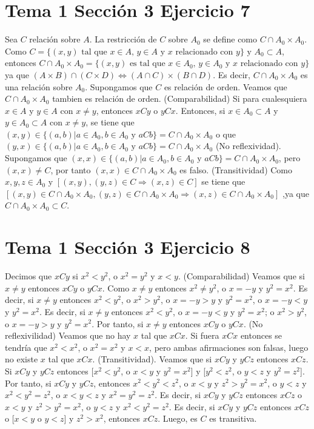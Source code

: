 \documentclass{article}
\begin{document}
\section{Tema 1 Sección 3 Ejercicio 7}
Sea \(C\) relación sobre \(A\). La restricción de \(C\) sobre \(A_0\) se define como \(C\cap A_0\times A_0\). Como \(C=\{(x,y)\text{ tal que } x\in A \text{, } y \in A \text{ y } x \text{ relacionado con }y\} \text{ y } A_0 \subset A\), entonces \(C\cap A_0 \times A_0 =\{(x,y) \text{ es tal que } x\in A_0 \text{, } y \in A_0 \text{ y } x \text{ relacionado con } y\}\) ya que \((A\times B)\cap(C\times D)\Leftrightarrow (A \cap C)\times (B \cap D)\). Es decir, \(C\cap A_0 \times A_0\)  es una relación sobre \(A_0\). Supongamos que \(C\) es relación de orden. Veamos que \(C\cap A_0 \times A_0\) tambien es relación de orden. (Comparabilidad) Si para cualesquiera \(x\in A\) y \(y\in A\) con \(x\neq y\), entonces \(xCy\) o \(yCx\). Entonces, si \(x \in A_0 \subset A\) y \(y \in A_0 \subset A\) con \(x\neq y\), se tiene que \((x,y)\in \{(a,b)| a\in A_0, b\in A_0 \text{ y } aCb\} = C\cap A_0 \times A_0 \) o que \((y,x)\in \{(a,b)| a\in A_0, b\in A_0 \text { y } aCb\} = C\cap A_0 \times A_0 \) (No reflexividad). Supongamos que \((x,x)\in \{(a,b)| a\in A_0, b\in A_0 \text { y } aCb\} = C\cap A_0 \times A_0 \), pero \((x,x)\neq C\), por tanto  \((x,x)\in C\cap A_0 \times A_0 \) es falso. (Transitividad) Como \(x, y, z \in A_0\text{ y } [(x,y),(y,z)\in C \Rightarrow (x,z)\in C]\) se tiene que \([(x,y)\in C\cap A_0 \times A_0,(y,z)\in C\cap A_0 \times A_0 \Rightarrow (x,z)\in C\cap A_0 \times A_0]\) ,ya que \(C\cap A_0 \times A_0\subset C\).
\section{Tema 1 Sección 3 Ejercicio 8}
Decimos que \(xCy\) si \(x^2<y^2\), o \(x^2 = y^2\) y \(x<y\). (Comparabilidad) Veamos que si \(x\neq y\)  entonces \(xCy\) o \(yCx\). Como \(x\neq y\) entonces \( x^2 \neq y^2\), o \(x=-y\) y \(y^2=x^2\). Es decir, si \(x\neq y\) entonces \( x^2 < y^2\), o \( x^2 > y^2\), o \(x=-y>y\) y \(y^2=x^2\), o \(x=-y<y\) y \(y^2=x^2\). Es decir, si \(x\neq y\) entonces \( x^2 < y^2\), o \(x=-y<y\) y \(y^2=x^2\); o  \( x^2 > y^2\), o \(x=-y>y\) y \(y^2=x^2\). Por tanto, si \(x \neq y\) entonces \(xCy\) o \(yCx\). (No reflexivilidad) Veamos que no hay \(x\) tal que \(xCx\). Si fuera \(xCx\) entonces se tendría que \(x^2<x^2\), o \(x^2 = x^2\) y \(x<x\), pero ambas afirmaciones son falsas, luego no existe \(x\) tal que \(xCx\). (Transitividad). Veamos que si \(xCy\) y \(yCz\) entonces \(xCz\). Si \(xCy\) y \(yCz\) entonces [\( x^2 < y^2\), o \(x<y\) y \(y^2=x^2\)] y [\( y^2 < z^2\), o \(y<z\) y \(y^2=z^2\)]. Por tanto, si \(xCy\) y \(yCz\), entonces \( x^2 < y^2<z^2\), o \(x<y\) y \(z^2>y^2=x^2\), o \(y<z\) y \(x^2<y^2=z^2\), o \(x<y<z\) y \(x^2=y^2=z^2\). Es decir, si \(xCy\) y \(yCz\) entonces \(xCz\) o \(x<y \) y \(z^2>y^2=x^2\), o \(y<z\) y \(x^2<y^2=z^2\). Es decir, si \(xCy\) y \(yCz\) entonces  \(xCz\) o [\(x<y \text{ o } y<z \)] y \(z^2>x^2\), entonces  \(xCz\). Luego, es \(C\) es transitiva.
%
%
\end{document}
